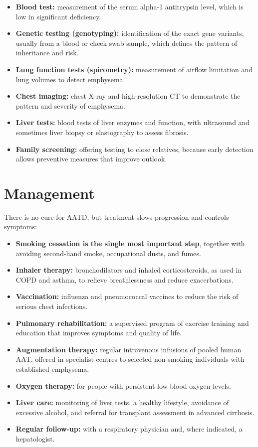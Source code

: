 \begin{itemize}
    \item \textbf{Blood test:} measurement of the serum alpha-1 antitrypsin level, which is low in significant deficiency.
    \item \textbf{Genetic testing (genotyping):} identification of the exact gene variants, usually from a blood or cheek swab sample, which defines the pattern of inheritance and risk.
    \item \textbf{Lung function tests (spirometry):} measurement of airflow limitation and lung volumes to detect emphysema.
    \item \textbf{Chest imaging:} chest X-ray and high-resolution CT to demonstrate the pattern and severity of emphysema.
    \item \textbf{Liver tests:} blood tests of liver enzymes and function, with ultrasound and sometimes liver biopsy or elastography to assess fibrosis.
    \item \textbf{Family screening:} offering testing to close relatives, because early detection allows preventive measures that improve outlook.
\end{itemize}

\section*{Management}
There is no cure for AATD, but treatment slows progression and controls symptoms:

\begin{itemize}
    \item \textbf{Smoking cessation is the single most important step}, together with avoiding second-hand smoke, occupational dusts, and fumes.
    \item \textbf{Inhaler therapy:} bronchodilators and inhaled corticosteroids, as used in COPD and asthma, to relieve breathlessness and reduce exacerbations.
    \item \textbf{Vaccination:} influenza and pneumococcal vaccines to reduce the risk of serious chest infections.
    \item \textbf{Pulmonary rehabilitation:} a supervised program of exercise training and education that improves symptoms and quality of life.
    \item \textbf{Augmentation therapy:} regular intravenous infusions of pooled human AAT, offered in specialist centres to selected non-smoking individuals with established emphysema.
    \item \textbf{Oxygen therapy:} for people with persistent low blood oxygen levels.
    \item \textbf{Liver care:} monitoring of liver tests, a healthy lifestyle, avoidance of excessive alcohol, and referral for transplant assessment in advanced cirrhosis.
    \item \textbf{Regular follow-up:} with a respiratory physician and, where indicated, a hepatologist.
\end{itemize}

